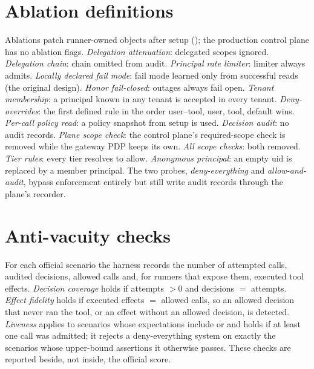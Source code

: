 \section{Ablation definitions}
\label{app:ablations}
Ablations patch runner-owned objects after setup (); the production control plane has no ablation flags. \emph{Delegation attenuation}: delegated scopes ignored. \emph{Delegation chain}: chain omitted from audit. \emph{Principal rate limiter}: limiter always admits. \emph{Locally declared fail mode}: fail mode learned only from successful reads (the original design). \emph{Honor fail-closed}: outages always fail open. \emph{Tenant membership}: a principal known in any tenant is accepted in every tenant. \emph{Deny-overrides}: the first defined rule in the order user--tool, user, tool, default wins. \emph{Per-call policy read}: a policy snapshot from setup is used. \emph{Decision audit}: no audit records. \emph{Plane scope check}: the control plane's required-scope check is removed while the gateway PDP keeps its own. \emph{All scope checks}: both removed. \emph{Tier rules}: every tier resolves to allow. \emph{Anonymous principal}: an empty uid is replaced by a member principal. The two probes, \emph{deny-everything} and \emph{allow-and-audit}, bypass enforcement entirely but still write audit records through the plane's recorder.

\section{Anti-vacuity checks}
\label{app:av}
For each official scenario the harness records the number of attempted calls, audited decisions, allowed calls and, for runners that expose them, executed tool effects. \emph{Decision coverage} holds if attempts $>0$ and decisions $=$ attempts. \emph{Effect fidelity} holds if executed effects $=$ allowed calls, so an allowed decision that never ran the tool, or an effect without an allowed decision, is detected. \emph{Liveness} applies to scenarios whose expectations include  or  and holds if at least one call was admitted; it rejects a deny-everything system on exactly the scenarios whose upper-bound assertions it otherwise passes. These checks are reported beside, not inside, the official score.

